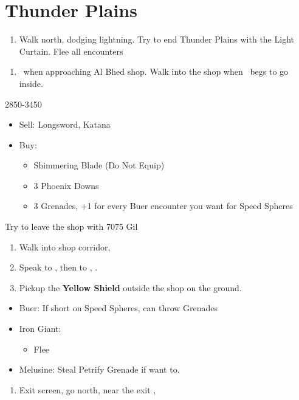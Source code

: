 \chapter{Thunder Plains}

\begin{enumerate}
  \item Walk north, dodging lightning. Try to end Thunder Plains with the Light Curtain. Flee all encounters
\end{enumerate}
\begin{enumerate}[resume]
  \item \sd\ when approaching Al Bhed shop. Walk into the shop when \rikku\ begs to go inside.
\end{enumerate}
\begin{shop}{2850-3450}
  \begin{itemize}
    \item Sell: Longsword, Katana
    \item Buy:
          \begin{itemize}
            \item Shimmering Blade (Do Not Equip)
            \item 3 Phoenix Downs
            \item 3 Grenades, +1 for every Buer encounter you want for Speed Spheres
          \end{itemize}
  \end{itemize}
Try to leave the shop with 7075 Gil
\end{shop}
\begin{enumerate}[resume]
  \item Walk into shop corridor, \cs[2:00]
  \item Speak to \auron, then to \rikku, \sd.
  \item Pickup the \textbf{Yellow Shield} outside the shop on the ground.
  \end{enumerate}
  
\begin{encounters}
  \begin{itemize}
    \item Buer: If short on Speed Spheres, can throw Grenades
    \item Iron Giant:
          \begin{itemize}
            \switch{\tidus}{\rikku}
            \rikkuf Steal Light Curtain
            \switch{\wakka}{\tidus}
            \tidusf Defend
            \enemyf Attacks \rikku
            \auronf Defend
            \item Flee 
          \end{itemize}
    \item Melusine: Steal Petrify Grenade if want to.
  \end{itemize}
\end{encounters}
\begin{enumerate}[resume]
  \item Exit screen, go north, near the exit \sd, \cs[3:10]
\end{enumerate}